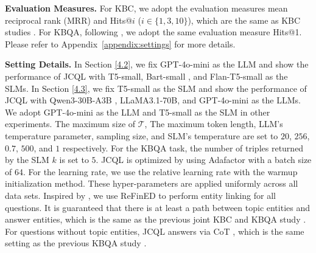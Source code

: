 \documentclass[11pt]{article}
\begin{document}
\noindent\textbf{Evaluation Measures.} 
For KBC, we adopt the evaluation measures mean reciprocal rank (MRR) and Hits@$i$ ($i \in \{1, 3, 10\}$), which are the same as KBC studies \cite{bordes2013, trouillon2016complex}. For KBQA, following \cite{sun2023thinkongraph, xu-etal-2024-generate}, we adopt the same evaluation measure Hits@1. Please refer to Appendix~\ref{appendix:settings} for more details.

\noindent\textbf{Setting Details.}
In Section \ref{4.2}, we fix GPT-4o-mini as the LLM and show the performance of JCQL with T5-small, Bart-small \cite{bart}, and Flan-T5-small \cite{flan-t5} as the SLMs. In Section \ref{4.3}, we fix T5-small as the SLM and show the performance of JCQL with Qwen3-30B-A3B \cite{qwen3-embedding}, LLaMA3.1-70B, and GPT-4o-mini as the LLMs. We adopt GPT-4o-mini as the LLM and T5-small as the SLM in other experiments. The maximum size of $\mathcal{T}$, The maximum token length, LLM's temperature parameter, sampling size, and SLM's temperature are set to $20$, $256$, $0.7$, $500$, and $1$ respectively. For the KBQA task, the number of triples returned by the SLM $k$ is set to $5$. JCQL is optimized by using Adafactor with a batch size of 64. For the learning rate, we use the relative learning rate with the warmup initialization method. These hyper-parameters are applied uniformly across all data sets.
Inspired by \cite{sun2023thinkongraph}, we use ReFinED \cite{ayoola2022refinedefficientzeroshotcapableapproach} to perform entity linking for all questions. It is guaranteed that there is at least a path between topic entities and answer entities, which is the same as the previous joint KBC and KBQA study \cite{lihui2022binet}. For questions without topic entities, JCQL answers via CoT \cite{wei2023chainofthoughtpromptingelicitsreasoning}, which is the same setting as the previous KBQA study \cite{sun2023thinkongraph}.
\end{document}
